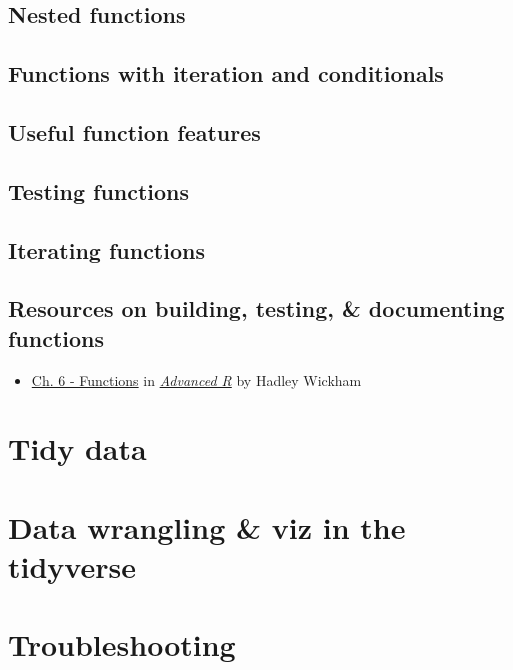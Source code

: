 \documentclass[
]{book}
\providecommand{\tightlist}{%
  \setlength{\itemsep}{0pt}\setlength{\parskip}{0pt}}
\begin{document}
\hypertarget{nested-functions}{%
\section{Nested functions}\label{nested-functions}}

\hypertarget{functions-with-iteration-and-conditionals}{%
\section{Functions with iteration and conditionals}\label{functions-with-iteration-and-conditionals}}

\hypertarget{useful-function-features}{%
\section{Useful function features}\label{useful-function-features}}

\hypertarget{testing-functions}{%
\section{Testing functions}\label{testing-functions}}

\hypertarget{iterating-functions}{%
\section{Iterating functions}\label{iterating-functions}}

\hypertarget{resources-on-building-testing-documenting-functions}{%
\section{Resources on building, testing, \& documenting functions}\label{resources-on-building-testing-documenting-functions}}

\begin{itemize}
\tightlist
\item
  \href{https://adv-r.hadley.nz/functions.html}{Ch. 6 - Functions} in \href{https://adv-r.hadley.nz/}{\emph{Advanced R}} by Hadley Wickham
\end{itemize}

\hypertarget{tidydata}{%
\chapter{Tidy data}\label{tidydata}}

\hypertarget{tidyverse}{%
\chapter{Data wrangling \& viz in the tidyverse}\label{tidyverse}}

\hypertarget{troubleshooting}{%
\chapter{Troubleshooting}\label{troubleshooting}}

  
\end{document}
